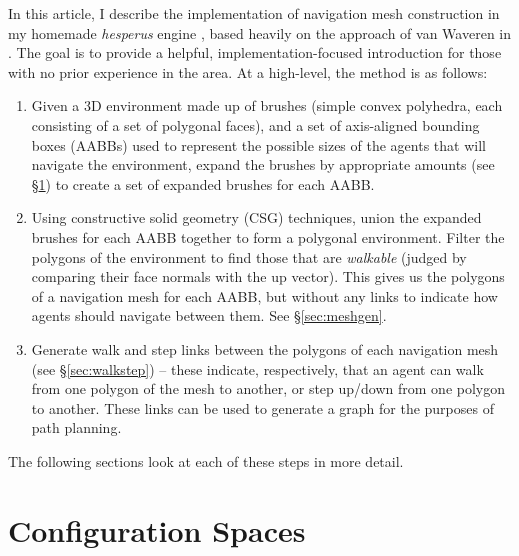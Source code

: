 \documentclass[10pt,twocolumn]{article}
\begin{document}
In this article, I describe the implementation of navigation mesh construction in my homemade \emph{hesperus} engine \cite{hesperus}, based heavily on the approach of van Waveren in \cite{vanwaveren01}. The goal is to provide a helpful, implementation-focused introduction for those with no prior experience in the area. At a high-level, the method is as follows:
%
\begin{enumerate}
\item Given a 3D environment made up of brushes (simple convex polyhedra, each consisting of a set of polygonal faces), and a set of axis-aligned bounding boxes (AABBs) used to represent the possible sizes of the agents that will navigate the environment, expand the brushes by appropriate amounts (see \S\ref{sec:configspace}) to create a set of expanded brushes for each AABB.
\item Using constructive solid geometry (CSG) techniques, union the expanded brushes for each AABB together to form a polygonal environment. Filter the polygons of the environment to find those that are \emph{walkable} (judged by comparing their face normals with the up vector). This gives us the polygons of a navigation mesh for each AABB, but without any links to indicate how agents should navigate between them. See \S\ref{sec:meshgen}.
\item Generate walk and step links between the polygons of each navigation mesh (see \S\ref{sec:walkstep}) -- these indicate, respectively, that an agent can walk from one polygon of the mesh to another, or step up/down from one polygon to another. These links can be used to generate a graph for the purposes of path planning.
\end{enumerate}
%
The following sections look at each of these steps in more detail.

\section{Configuration Spaces}
\label{sec:configspace}
\end{document}
